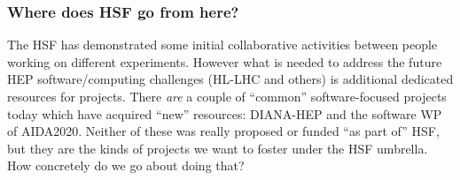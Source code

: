 \begin{frame}
\frametitle{Where does HSF go from here?}

  The HSF has demonstrated some initial collaborative activities between people working on different experiments. However what is needed to address the future HEP software/computing challenges (HL-LHC and others) is additional dedicated resources for projects.
\vskip 0.15in
  There {\em are} a couple of ``common'' software-focused projects today which have acquired ``new'' resources: DIANA-HEP and the software WP of AIDA2020. Neither of these was really proposed or funded ``as part of'' HSF, but they are the kinds of projects we want to foster under the HSF umbrella. How concretely do we go about doing that?
\vskip 0.15in

\end{frame}


